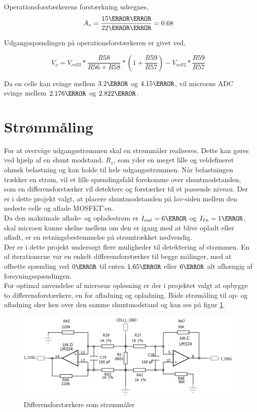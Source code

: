 Operationsforstærkerens forstærkning udregnes,
\begin {equation} 
A_{v} = \frac{15\kilo\ohm}{22\kilo\ohm} = 0.68
\end {equation}

Udgangsspændingen på operationsforstærkeren er givet ved,

\begin {equation} 
V_{o} = V_{cell3} * \frac{R58}{R56+R58} * (1+\frac{R59}{R57}) - V_{cell2} * \frac{R59}{R57} \label{eq:op_amp_gain}
\end {equation}

Da en celle kan svinge mellem $3.2\volt$ og $4.15\volt$, vil microens ADC svinge mellem $2.176\volt$ og $2.822\volt$.

\section{Strømmåling}\label{afs:current_meas}
For at overvåge udgangsstrømmen skal en strømmåler realiseres. Dette kan gøres ved hjælp af en shunt modstand, $R_{s}$, som yder en meget lille og veldefineret ohmsk belastning og kan holde til hele udgangsstrømmen. Når belastningen trækker en strøm, vil et lille spændingsfald forekomme over shuntmodstanden, som en differensforstærker vil detektere og forstærker til et passende niveau. Der er i dette projekt valgt, at placere shuntmodstanden på lav-siden mellem den nedeste celle og aflade MOSFET'en.
\\

Da den maksimale aflade- og opladestrøm  er $I_{out} = 6\ampere$ og $I_{In} = 1\ampere$, skal microen kunne skelne mellem om den er igang med at blive opladt eller afladt, er en retningsbestemmelse på strømtrækket nødvendig.
\\
Der er i dette projekt undersøgt flere muligheder til detektering af strømmen. En af iterationerne var en enkelt differensforstærker til begge målinger, med at offsette spænding ved $0\volt$ til enten $1.65\volt$ eller $6\volt$ alt afhængig af forsyningsspændingen.
\\

For optimal anvendelse af microens opløsning er der i projektet valgt at opbygge to differensforstærkere, en for afladning og opladning. Både strømåling til op- og afladning sker hen over den samme shuntmodstand og kan ses på figur \ref{fig:current_sense}.

\begin{figure}[h]
	\centering
	\includegraphics[width=15cm]{billeder/current_meassurement.png}
	\caption{Differensforstærkere som strømmåler}
	\label{fig:current_sense}
\end{figure}

